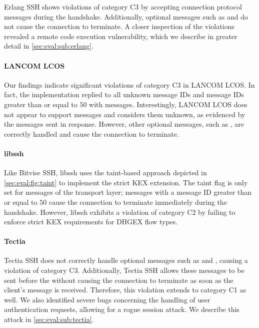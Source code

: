 Erlang SSH shows violations of category C3 by accepting connection protocol messages during the handshake. Additionally, optional messages such as \msgignore and \msgdebug do not cause the connection to terminate. A closer inspection of the violations revealed a remote code execution vulnerability, which we describe in greater detail in \autoref{sec:eval:sub:erlang}.

\paragraph{LANCOM LCOS} 

Our findings indicate significant violations of category C3 in LANCOM LCOS. In fact, the implementation replied to all unknown message IDs and message IDs greater than or equal to $50$ with \msgunimplemented messages. Interestingly, LANCOM LCOS does not appear to support \msgdebug messages and considers them unknown, as evidenced by the \msgunimplemented messages sent in response. However, other optional messages, such as \msgignore, are correctly handled and cause the connection to terminate.

\paragraph{libssh} 

Like Bitvise SSH, libssh uses the taint-based approach depicted in \autoref{sec:eval:fig:taint} to implement the strict KEX extension. The taint flag is only set for messages of the transport layer; messages with a message ID greater than or equal to $50$ cause the connection to terminate immediately during the handshake. However, libssh exhibits a violation of category C2 by failing to enforce strict KEX requirements for DHGEX flow types.

\paragraph{Tectia} 

Tectia SSH does not correctly handle optional messages such as \msgignore and \msgdebug, causing a violation of category C3. Additionally, Tectia SSH allows these messages to be sent before the \msgkexinit without causing the connection to terminate as soon as the client's \msgkexinit message is received. Therefore, this violation extends to category C1 as well. We also identified severe bugs concerning the handling of user authentication requests, allowing for a rogue session attack. We describe this attack in \autoref{sec:eval:sub:tectia}.

